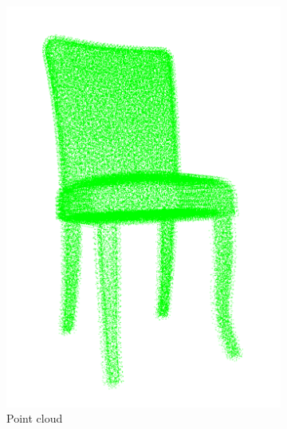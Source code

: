 \begin{figure}[!t]
\begin{subfigure}{0.2\linewidth}
		\includegraphics[width=\linewidth]{Figures/ObjRecog/chair_cloud}
		\caption{Point cloud}
		\label{subfig:objrecog:3d_mesh_cloud_grid:cloud}
	\end{subfigure}
	\hfill
	\begin{subfigure}{0.2\linewidth}

\end{subfigure}
\end{figure}
